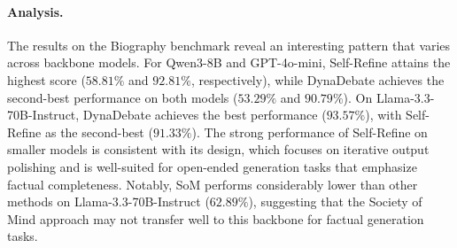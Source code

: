 \paragraph{Analysis.}
The results on the Biography benchmark reveal an interesting pattern that varies across backbone models.
For Qwen3-8B and GPT-4o-mini, Self-Refine attains the highest score ($58.81\%$ and $92.81\%$, respectively), while DynaDebate achieves the second-best performance on both models ($53.29\%$ and $90.79\%$).
On Llama-3.3-70B-Instruct, DynaDebate achieves the best performance ($93.57\%$), with Self-Refine as the second-best ($91.33\%$).
The strong performance of Self-Refine on smaller models is consistent with its design, which focuses on iterative output polishing and is well-suited for open-ended generation tasks that emphasize factual completeness.
Notably, SoM performs considerably lower than other methods on Llama-3.3-70B-Instruct ($62.89\%$), suggesting that the Society of Mind approach may not transfer well to this backbone for factual generation tasks.
